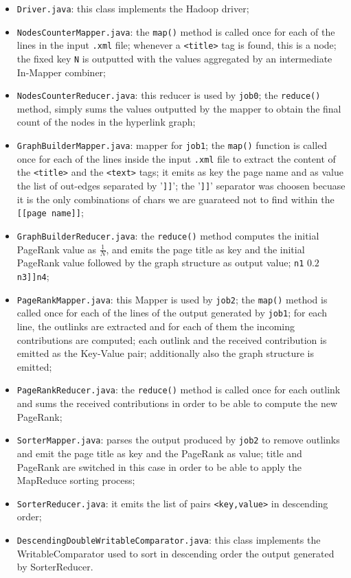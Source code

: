 \documentclass[11pt,a4paper]{article}
\begin{document}
\begin{itemize}
    \item \texttt{Driver.java}: this class implements the Hadoop driver;
    \item \texttt{NodesCounterMapper.java}: the \texttt{map()} method is called once for each of the lines in the input \texttt{.xml} file; whenever a \texttt{<title>} tag is found, this is a node; the fixed key \texttt{N} is outputted with the values aggregated by an intermediate In-Mapper combiner;
    \item \texttt{NodesCounterReducer.java}: 
    this reducer is used by \texttt{job0}; the \texttt{reduce()} method, simply sums the values outputted by the mapper to obtain the final count of the nodes in the hyperlink graph;
    \item \texttt{GraphBuilderMapper.java}: mapper for \texttt{job1}; the \texttt{map()} function is called once for each of the lines inside the input \texttt{.xml} file to extract the content of the \texttt{<title>} and the \texttt{<text>} tags; it emits as key the page name and as value the list of out-edges separated by '\texttt{]]}'; the '\texttt{]]}' separator was choosen becuase it is the only combinations of chars we are guarateed not to find within the \texttt{[[page name]]};
    \item \texttt{GraphBuilderReducer.java}: the \texttt{reduce()} method computes the initial PageRank value as $\frac{1}{N}$, and emits the page title as key and the initial PageRank value followed by the graph structure as output value;
    \texttt{n1} $0.2$ \texttt{n3]]n4};
    \item \texttt{PageRankMapper.java}: this Mapper is used by \texttt{job2}; the \texttt{map()} method is called once for each of the lines of the output generated by \texttt{job1}; for each line, the outlinks are extracted and for each of them the incoming contributions are computed; each outlink and the received contribution is emitted as the Key-Value pair; additionally also the graph structure is emitted;
    \item \texttt{PageRankReducer.java}: the \texttt{reduce()} method is called once for each outlink and sums the received contributions in order to be able to compute the new PageRank;
    \item \texttt{SorterMapper.java}: parses the output produced by \texttt{job2} to remove outlinks and emit the page title as key and the PageRank as value; title and PageRank are switched in this case in order to be able to apply the MapReduce sorting process;
    \item \texttt{SorterReducer.java}: it emits the list of pairs \texttt{<key,value>} in descending order;
    \item \texttt{DescendingDoubleWritableComparator.java}: this class implements the WritableComparator used to sort in descending order the output generated by SorterReducer.
\end{itemize}
\end{document}
